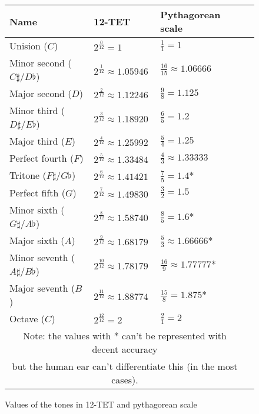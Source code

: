 \documentclass[]{article}
\begin{document}
                \begin{figure}[h]
                    \begin{center}
                        \begin{tabular}{| l | l | l | l |}
                            \hline
                            \textbf{Name} & \textbf{12-TET} & \textbf{Pythagorean scale}\\\hline
                            Unision ($C$) & $2^\frac{0}{12} = 1$ & $\frac{1}{1} = 1$ \\ \hline
                            Minor second ($C\sharp/D\flat$) & $2^\frac{1}{12} \approx 1.05946$ & $\frac{16}{15} \approx 1.06666$\\ \hline
                            Major second ($D$) & $2^\frac{2}{12} \approx 1.12246$ & $\frac{9}{8} = 1.125$ \\ \hline
                            Minor third ($D\sharp/E\flat$) & $2^\frac{3}{12} \approx 1.18920$ & $\frac{6}{5} = 1.2$ \\ \hline
                            Major third ($E$) & $2^\frac{4}{12} \approx 1.25992$ & $\frac{5}{4} = 1.25$ \\ \hline
                            Perfect fourth ($F$) & $2^\frac{5}{12} \approx 1.33484$ & $\frac{4}{3} \approx 1.33333$ \\ \hline
                            Tritone ($F\sharp/G\flat$) & $2^\frac{6}{12} \approx 1.41421$ & $\frac{7}{5} = 1.4$* \\ \hline
                            Perfect fifth ($G$) & $2^\frac{7}{12} \approx 1.49830$ & $\frac{3}{2} = 1.5$ \\ \hline
                            Minor sixth ($G\sharp/A\flat$) & $2^\frac{8}{12} \approx 1.58740$ & $\frac{8}{5} = 1.6$* \\ \hline
                            Major sixth ($A$) & $2^\frac{9}{12} \approx 1.68179$ & $\frac{5}{3} \approx 1.66666$* \\ \hline
                            Minor seventh ($A\sharp/B\flat$) & $2^\frac{10}{12} \approx 1.78179$ & $\frac{16}{9} \approx 1.77777$* \\ \hline
                            Major seventh ($B$) & $2^\frac{11}{12} \approx 1.88774$ & $\frac{15}{8} = 1.875$* \\ \hline
                            Octave ($C$) & $2^\frac{12}{12} = 2$ & $\frac{2}{1} = 2$ \\ \hline
                            \multicolumn{3}{c}{Note: the values with * can't be represented with decent accuracy}\\
                            \multicolumn{3}{c}{but the human ear can't differentiate this (in the most cases).}\\
                        \end{tabular}
                        \caption{Values of the tones in 12-TET and pythagorean scale}
                    \end{center}
                \end{figure}
\end{document}
